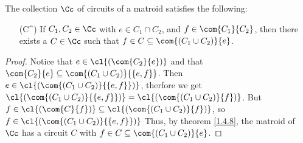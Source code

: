 \begin{theorem}\label{1.4.9}
    The collection $\Cc$ of circuits of a matroid satisfies the following:
    \begin{enumerate}
        \item[(C^\prime3)] If $C_1,C_2 \in \Cc$ with $e \in C_1 \cap C_2$, and $f
            \in \com{C_1}{C_2}$, then there exists a $C \in \Cc$ such that  $f
            \in C \subseteq \com{(C_1 \cup C_2)}{e}$.
    \end{enumerate}
\end{theorem}
\begin{proof}
    Notice that $e \in \cl{(\com{C_2}{e})}$ and that $\com{C_2}{e} \subseteq
    \com{(C_1 \cup C_2)}{\{e,f\}}$. Then $e \in \cl{(\com{(C_1 \cup
    C_2)}{\{e,f\}})}$, therfore we get $\cl{(\com{(C_1 \cup
C_2)}{\{e,f\}})}=\cl{(\com{(C_1 \cup C_2)}{f})}$. But $f \in \cl{(\com{C}{f})}
\subseteq \cl{(\com{(C_1 \cup C_2)}{f})}$, so $f \in
\cl{(\com{(C_1 \cup C_2)}{\{e,f\}})}$ Thus, by theorem \ref{1.4.8}, the matroid
of $\Cc$ has a circuit $C$ with $f \in C \subseteq \com{(C_1 \cup C_2)}{e}$.
\end{proof}

